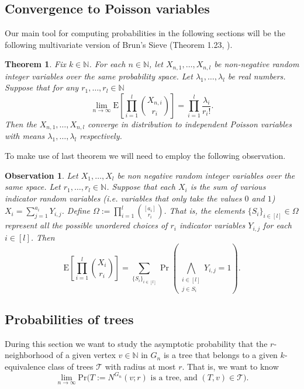 \documentclass[12pt,notitlepage,a4paper]{article}
\newtheorem{theorem}{Theorem}[section]
\newtheorem{obs}{Observation}[section]
\theoremstyle{definition}
\newcommand{\N}{\mathbb{N}}
\newcommand{\Ln}{\lim\limits_{n\to \infty}}
\begin{document}
\subsection{Convergence to Poisson variables}

Our main tool for computing probabilities in the following sections
will be the following multivariate version of Brun's Sieve 
(Theorem 1.23, \cite{bollobas2001random}).


\begin{theorem} \label{thm:BrunSieve}
	Fix $k\in \N$. For each 
	$n\in \N$, let $X_{n,1},\dots, X_{n,l}$ be non-negative
	random integer variables over the same
	probability space. Let $\lambda_1,\dots,\lambda_l$ 
	be real numbers. Suppose that for any $r_1,\dots,r_l \in \N$
	\[ 
	\Ln \mathrm{E}\left[
	\prod_{i=1}^{l} \binom{X_{n,i}}{r_i} \right]
	= \prod_{i=1}^{l} \frac{\lambda_i}{r_i !}.	
	\]
	Then the $X_{n,1},\dots,X_{n,l}$ converge in distribution to
	independent Poisson variables with means $\lambda_1,\dots,\lambda_l$ 
	respectively. 
\end{theorem}

To make use of last theorem we will need to employ the following observation.

\begin{obs} \label{obs:binomialmean} Let $X_1,\dots, X_l$ be non negative
	random integer variables over the same space. 
	Let $r_1,\dots,r_l\in \N$.	Suppose that
	each $X_i$ is the sum of various indicator random variables
	(i.e. variables that only take the values $0$ and $1$)
	$X_i=\sum_{j=1}^{a_i} Y_{i,j}$. Define 
	$\Omega:=\prod_{i=1}^l \binom{[a_i]}{r_i}$. That is,
	the elements $\{S_i\}_{i\in[l]}\in \Omega$
	represent all the possible unordered choices of 
	$r_i$ indicator variables $Y_{i,j}$ for each $i\in [l]$.
	Then 
	\[
	\mathrm{E}\left[
	\prod_{i=1}^{l} \binom{X_i}{r_i}\right]=
	\sum_{\{S_i\}_{i\in [l]}} \Pr\left(
	\bigwedge_{\substack{i\in [l]\\ j\in S_i}} Y_{i,j}=1
	\right).	
	\]
\end{obs} 



\subsection{Probabilities of trees}

During this section we want to study
the asymptotic probability that the 
$r$-neighborhood of a given vertex $v\in \N$
in $G_n$ 
is a tree that belongs to a given $k$-equivalence
class of trees $\mathcal{T}$ with radius at most
$r$. That is, we want to know
\[\Ln \mathrm{Pr}\big( 
T:=N^{G_n}(v;r) \text{ is a tree, and } (T,v)\in \mathcal{T} \big). 
\]
\end{document}
